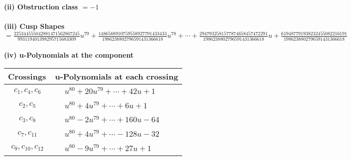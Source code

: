 \documentclass[1p]{elsarticle_modified}
\theoremstyle{definition}
\begin{document}
\flushleft \textbf{(ii) Obstruction class $= -1$}\\~\\
\flushleft \textbf{(iii) Cusp Shapes $= \frac{225344555042881471562867245}{993119401398295715683309} u^{79}+\frac{1486568910759558927791433433}{1986238802796591431366618} u^{78}+\cdots+\frac{2947932581577874658457472291}{1986238802796591431366618} u+\frac{619487791938232455082216191}{1986238802796591431366618}$}\\~\\
\newpage\renewcommand{\arraystretch}{1}
\flushleft \textbf{(iv) u-Polynomials at the component}\newline \\
\begin{tabular}{m{50pt}|m{274pt}}
Crossings & \hspace{64pt}u-Polynomials at each crossing \\
\hline $$\begin{aligned}c_{1},c_{4},c_{6}\end{aligned}$$&$\begin{aligned}
&u^{80}+20 u^{79}+\cdots+42 u+1
\end{aligned}$\\
\hline $$\begin{aligned}c_{2},c_{5}\end{aligned}$$&$\begin{aligned}
&u^{80}+4 u^{79}+\cdots+6 u+1
\end{aligned}$\\
\hline $$\begin{aligned}c_{3},c_{8}\end{aligned}$$&$\begin{aligned}
&u^{80}-2 u^{79}+\cdots+160 u-64
\end{aligned}$\\
\hline $$\begin{aligned}c_{7},c_{11}\end{aligned}$$&$\begin{aligned}
&u^{80}+4 u^{79}+\cdots-128 u-32
\end{aligned}$\\
\hline $$\begin{aligned}c_{9},c_{10},c_{12}\end{aligned}$$&$\begin{aligned}
&u^{80}-9 u^{79}+\cdots+27 u+1
\end{aligned}$\\
\hline
\end{tabular}\\~\\
\end{document}
